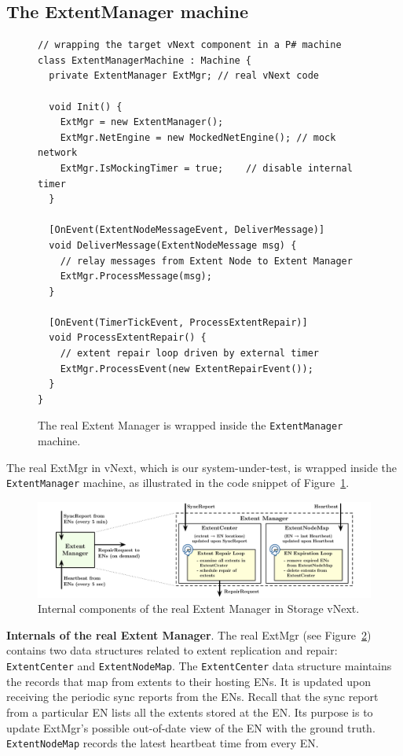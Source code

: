 \subsection{The ExtentManager machine}
\label{sec:method:wrap_target}

\begin{figure}[t]
\begin{lstlisting}
// wrapping the target vNext component in a P# machine
class ExtentManagerMachine : Machine {
  private ExtentManager ExtMgr; // real vNext code

  void Init() {
    ExtMgr = new ExtentManager();
    ExtMgr.NetEngine = new MockedNetEngine(); // mock network
    ExtMgr.IsMockingTimer = true;	 // disable internal timer
  }

  [OnEvent(ExtentNodeMessageEvent, DeliverMessage)]
  void DeliverMessage(ExtentNodeMessage msg) {
    // relay messages from Extent Node to Extent Manager
    ExtMgr.ProcessMessage(msg);
  }
	
  [OnEvent(TimerTickEvent, ProcessExtentRepair)]
  void ProcessExtentRepair() {
    // extent repair loop driven by external timer
    ExtMgr.ProcessEvent(new ExtentRepairEvent());
  }
}
\end{lstlisting}
\vspace{-3mm}
\caption{The real Extent Manager is wrapped inside the \texttt{ExtentManager} \psharp machine.}
\label{fig:wrap_target}
\end{figure}

The real ExtMgr in vNext, which is our system-under-test, is wrapped inside the \texttt{ExtentManager} machine, as illustrated in the code snippet of Figure~\ref{fig:wrap_target}.

\begin{figure}[t]
\centering
\includegraphics[width=.9\linewidth]{img/extent_manager}
\caption{Internal components of the real Extent Manager in \Azure Storage vNext.}
\label{fig:extentmanager}
\vspace{-5mm}
\end{figure}

\textbf{Internals of the real Extent Manager}.
The real ExtMgr (see Figure~\ref{fig:extentmanager}) contains two data structures related to extent replication and repair: \texttt{ExtentCenter} and \texttt{ExtentNodeMap}. The \texttt{ExtentCenter} data structure maintains the records that map from extents to their hosting ENs. It is updated upon receiving the periodic sync reports from the ENs. Recall that the sync report from a particular EN lists all the extents stored at the EN. Its purpose is to update ExtMgr's possible out-of-date view of the EN with the ground truth. \texttt{ExtentNodeMap} records the latest heartbeat time from every EN.

